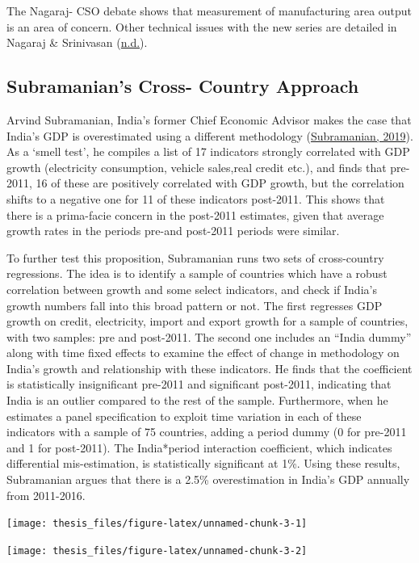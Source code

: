 \documentclass[12pt,nobind, a4paper]{reedthesis}
\begin{document}
 The Nagaraj- CSO debate shows that measurement of manufacturing area output is an area of concern. Other technical issues with the new series are detailed in Nagaraj \& Srinivasan (\protect\hyperlink{ref-nagaraj_measuring_nodate}{n.d.}).

 \hypertarget{subramanians-cross--country-approach}{%
 \subsection{Subramanian's Cross- Country Approach}\label{subramanians-cross--country-approach}}

 Arvind Subramanian, India's former Chief Economic Advisor makes the case that India's GDP is overestimated using a different methodology (\protect\hyperlink{ref-subramanian_indias_2019}{Subramanian, 2019}). As a `smell test', he compiles a list of 17 indicators strongly correlated with GDP growth (electricity consumption, vehicle sales,real credit etc.), and finds that pre-2011, 16 of these are positively correlated with GDP growth, but the correlation shifts to a negative one for 11 of these indicators post-2011. This shows that there is a prima-facie concern in the post-2011 estimates, given that average growth rates in the periods pre-and post-2011 periods were similar.
 \linebreak

 To further test this proposition, Subramanian runs two sets of cross-country regressions. The idea is to identify a sample of countries which have a robust correlation between growth and some select indicators, and check if India's growth numbers fall into this broad pattern or not. The first regresses GDP growth on credit, electricity, import and export growth for a sample of countries, with two samples: pre and post-2011. The second one includes an ``India dummy'' along with time fixed effects to examine the effect of change in methodology on India's growth and relationship with these indicators. He finds that the coefficient is statistically insignificant pre-2011 and significant post-2011, indicating that India is an outlier compared to the rest of the sample. Furthermore, when he estimates a panel specification to exploit time variation in each of these indicators with a sample of 75 countries, adding a period dummy (0 for pre-2011 and 1 for post-2011). The India*period interaction coefficient, which indicates differential mis-estimation, is statistically significant at 1\%. Using these results, Subramanian argues that there is a 2.5\% overestimation in India's GDP annually from 2011-2016.
 \begin{center}\texttt{[image: thesis\_files/figure-latex/unnamed-chunk-3-1]} \end{center}
 \begin{center}\texttt{[image: thesis\_files/figure-latex/unnamed-chunk-3-2]} \end{center}
\end{document}
